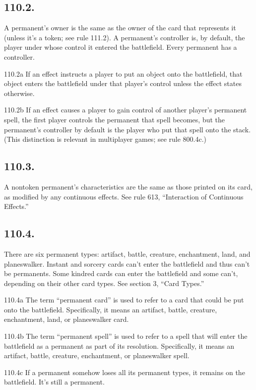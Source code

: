 \subsection*{110.2.}
A permanent’s owner is the same as the owner of the card that represents it (unless it’s a token; see rule 111.2). A permanent’s controller is, by default, the player under whose control it entered the battlefield. Every permanent has a controller.

110.2a If an effect instructs a player to put an object onto the battlefield, that object enters the battlefield under that player’s control unless the effect states otherwise.

110.2b If an effect causes a player to gain control of another player’s permanent spell, the first player controls the permanent that spell becomes, but the permanent’s controller by default is the player who put that spell onto the stack. (This distinction is relevant in multiplayer games; see rule 800.4c.)

\subsection*{110.3.}
A nontoken permanent’s characteristics are the same as those printed on its card, as modified by any continuous effects. See rule 613, “Interaction of Continuous Effects.”

\subsection*{110.4.}
There are six permanent types: artifact, battle, creature, enchantment, land, and planeswalker. Instant and sorcery cards can’t enter the battlefield and thus can’t be permanents. Some kindred cards can enter the battlefield and some can’t, depending on their other card types. See section 3, “Card Types.”

110.4a The term “permanent card” is used to refer to a card that could be put onto the battlefield. Specifically, it means an artifact, battle, creature, enchantment, land, or planeswalker card.

110.4b The term “permanent spell” is used to refer to a spell that will enter the battlefield as a permanent as part of its resolution. Specifically, it means an artifact, battle, creature, enchantment, or planeswalker spell.

110.4c If a permanent somehow loses all its permanent types, it remains on the battlefield. It’s still a permanent.

